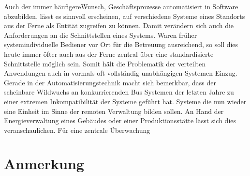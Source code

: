 Auch der immer häufigereWunsch, Geschäftsprozesse automatisiert in Software abzubilden,
lässt es sinnvoll erscheinen, auf verschiedene Systeme eines Standorts aus der Ferne
als Entität zugreifen zu können. Damit verändern sich auch die Anforderungen an die
Schnittstellen eines Systems. Waren früher systemindividuelle Bediener vor Ort für die
Betreuung ausreichend, so soll dies heute immer öfter auch aus der Ferne zentral über
eine standardisierte Schnittstelle möglich sein. Somit hält die Problematik der verteilten
Anwendungen auch in vormals oft vollständig unabhängigen Systemen Einzug.
Gerade in der Automatisierungstechnik macht sich bemerkbar, dass der scheinbare Wildwuchs
an konkurrierenden Bus Systemen der letzten Jahre zu einer extremen Inkompatibilität
der Systeme geführt hat. Systeme die nun wieder eine Einheit im Sinne der remoten
Verwaltung bilden sollen. An Hand der Energieverwaltung eines Gebäudes oder
einer Produktionsstätte lässt sich dies veranschaulichen. Für eine zentrale Überwachung


\section{Anmerkung}












